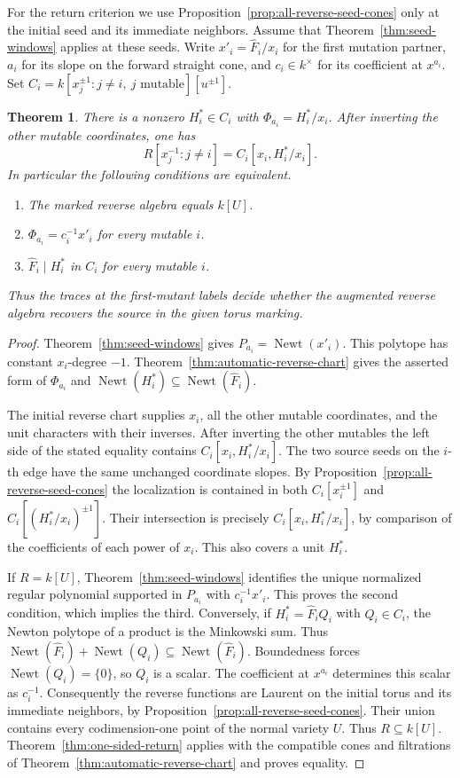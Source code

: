 \documentclass[11pt,reqno]{amsart}
\numberwithin{equation}{section}
\newtheorem{theorem}{Theorem}[section]
\theoremstyle{definition}
\theoremstyle{remark}
\DeclareMathOperator{\Newt}{Newt}
\begin{document}
For the return criterion we use Proposition~\ref{prop:all-reverse-seed-cones}
only at the initial seed and its immediate neighbors. Assume that
Theorem~\ref{thm:seed-windows} applies at these seeds.
Write \(x'_i=\widehat F_i/x_i\) for the first mutation partner,
\(a_i\) for its slope on the forward straight cone, and
\(c_i\in k^\times\) for its coefficient at \(x^{a_i}\).
Set \(C_i=k[x_j^{\pm1}:j\ne i,\ j\text{ mutable}][u^{\pm1}]\).
\begin{theorem}\label{thm:first-reverse-partner-return}
There is a nonzero \(H_i^*\in C_i\) with
\(\Phi_{a_i}=H_i^*/x_i\). After inverting the other mutable
coordinates, one has
\[ R[x_j^{-1}:j\ne i]=C_i[x_i,H_i^*/x_i]. \]
In particular the following conditions are equivalent.
\begin{enumerate}
\item The marked reverse algebra equals \(k[U]\).
\item \(\Phi_{a_i}=c_i^{-1}x'_i\) for every mutable \(i\).
\item \(\widehat F_i\mid H_i^*\) in \(C_i\) for every mutable \(i\).
\end{enumerate}
Thus the traces at the first-mutant labels decide whether the
augmented reverse algebra recovers the source in the given torus
marking.
\end{theorem}
\begin{proof}
Theorem~\ref{thm:seed-windows} gives
\(P_{a_i}=\Newt(x'_i)\). This polytope has constant \(x_i\)-degree
\(-1\). Theorem~\ref{thm:automatic-reverse-chart} gives the
asserted form of \(\Phi_{a_i}\) and
\(\Newt(H_i^*)\subseteq\Newt(\widehat F_i)\).

The initial reverse chart supplies \(x_i\), all the other mutable
coordinates, and the unit characters with their inverses.
After inverting the other mutables the left side of the stated
equality contains \(C_i[x_i,H_i^*/x_i]\). The two source seeds
on the \(i\)-th edge have the same unchanged coordinate slopes.
By Proposition~\ref{prop:all-reverse-seed-cones} the localization
is contained in both \(C_i[x_i^{\pm1}]\) and
\(C_i[(H_i^*/x_i)^{\pm1}]\). Their intersection is precisely
\(C_i[x_i,H_i^*/x_i]\), by comparison of the coefficients of
each power of \(x_i\). This also covers a unit \(H_i^*\).

If \(R=k[U]\), Theorem~\ref{thm:seed-windows} identifies the
unique normalized regular polynomial supported in \(P_{a_i}\)
with \(c_i^{-1}x'_i\). This proves the second condition, which
implies the third. Conversely, if \(H_i^*=\widehat F_i Q_i\)
with \(Q_i\in C_i\), the Newton polytope of a product is the
Minkowski sum. Thus \(\Newt(\widehat F_i)+\Newt(Q_i)\subseteq
\Newt(\widehat F_i)\). Boundedness forces \(\Newt(Q_i)=\{0\}\),
so \(Q_i\) is a scalar. The coefficient at \(x^{a_i}\) determines
this scalar as \(c_i^{-1}\). Consequently the reverse functions
are Laurent on the initial torus and its immediate neighbors, by
Proposition~\ref{prop:all-reverse-seed-cones}. Their union contains
every codimension-one point of the normal variety \(U\).
Thus \(R\subseteq k[U]\). Theorem~\ref{thm:one-sided-return} applies
with the compatible cones and filtrations of
Theorem~\ref{thm:automatic-reverse-chart} and proves equality.
\end{proof}
\end{document}
